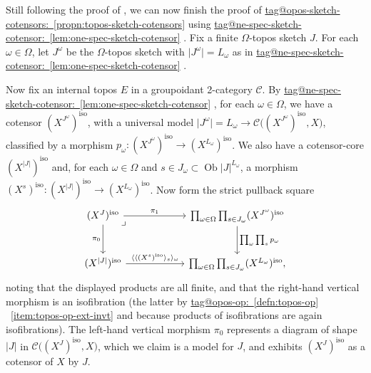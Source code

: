 \documentclass{amsart}
\makeatletter
\newcommand\abs[2][]{#1\lvert{#2}#1\rvert}
\newcommand\br[1]{\langle{}#1\rangle{}}
\newcommand\cC{\mathcal{C}}
\newcommand\iso{\mathrm{iso}}
\newcommand\Ob{\operatorname{Ob}}
\newcommand\pb[1][rd]{\ar[#1, phantom, "\lrcorner", pos=0]}
\newcommand\pbig[1]{\big({#1}\big)}
\newcommand\tagword[1]{\csname tag@#1\endcsname}
\def\label@tag#1:#2\@nil{#1}
\newcommand\labeltag[1]{\label@tag#1:\@nil}
\newcommand\jref[1]{%
  \texorpdfstring%
    {\hyperref[#1]{\tagword{\labeltag{#1}}~\ref*{#1}}}%
    {\tagword{\labeltag{#1}}~\ref*{#1}}%
}
\theoremstyle{definition}
\theoremstyle{remark}
\theoremstyle{plainwithref}
\makeatother
\begin{document}
Still following the proof of \cite[Proposition~A.0.1]{helfer-topoi-in-topoi}, we can now finish the proof of \jref{propn:topos-sketch-cotensors} using \jref{lem:one-spec-sketch-cotensor}.
Fix a finite \( \Omega \)-topos sketch \( J \).
  For each \( \omega \in \Omega \), let \( J^\omega \) be the \( \Omega \)-topos sketch with \( \abs{J^\omega} = L_\omega \) as in \jref{lem:one-spec-sketch-cotensor}.

  Now fix an internal topos \( E \) in a groupoidant 2-category \( \cC \).
  By \jref{lem:one-spec-sketch-cotensor}, for each \( \omega \in \Omega \), we have a cotensor \( (X^{J^\omega})^\iso \), with a universal model \( \abs{J^\omega} = L_\omega \to \cC\pbig{(X^{J^\omega})^\iso, X} \), classified by a morphism \( p_\omega \colon (X^{J^\omega})^\iso \to (X^{L_\omega})^\iso \).
  We also have a cotensor-core \( (X^{\abs{J}})^\iso \) and, for each \( \omega \in \Omega \) and \( s \in J_\omega \subset \Ob \abs{J}^{L_\omega} \), a morphism \( (X^s)^\iso \colon (X^{\abs{J}})^\iso \to (X^{L_\omega})^\iso \).
  Now form the strict pullback square
  \[
    \begin{tikzcd}
      (X^J)^\iso \pb \ar[r, "\pi_1"] \ar[d, "\pi_0"'] &[35pt] \prod_{\omega \in \Omega} \prod_{s \in J_\omega} (X^{J^\omega})^\iso \ar[d, "\prod_\omega \prod_s p_\omega"] \\[10pt]
      (X^{\abs J})^\iso \ar[r, "\br{\br{(X^s)^\iso}_s}_\omega"] & \prod_{\omega \in \Omega} \prod_{s \in J_\omega} (X^{L_\omega})^\iso,
    \end{tikzcd}
  \]
  noting that the displayed products are all finite, and that the right-hand vertical morphism is an isofibration (the latter by \jref{defn:topos-op}~\ref{item:topos-op-ext-invt} and because products of isofibrations are again isofibrations).
  The left-hand vertical morphism \( \pi_0 \) represents a diagram of shape \( \abs{J} \) in \( \cC\pbig{(X^J)^\iso, X} \), which we claim is a model for \( J \), and exhibits \( (X^J)^\iso \) as a cotensor of \( X \) by \( J \).
\end{document}

